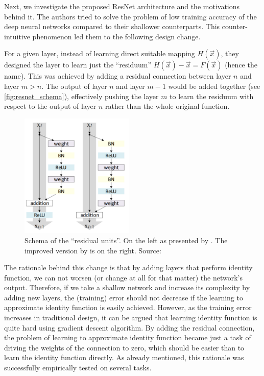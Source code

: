 Next, we investigate the proposed ResNet architecture and the motivations behind it. The authors tried to solve the problem of low training accuracy of the deep neural networks compared to their shallower counterparts. This counter-intuitive phenomenon led them to the following design change.

For a given layer, instead of learning direct suitable mapping $H(\vec{x})$, they designed the layer to learn just the ``residuum'' $H(\vec{x}) - \vec{x} = F(\vec{x})$ (hence the name). This was achieved by adding a residual connection between layer $n$ and layer $m > n$. The output of layer $n$ and layer $m - 1$ would be added together (see \autoref{fig:resnet_schema}), effectively pushing the layer $m$ to learn the residuum with respect to the output of layer $n$ rather than the whole original function.

\begin{figure}
    \centering
    \includegraphics[width=0.48\textwidth]{img/resnetv2.png}
    \caption[Residual units]{Schema of the ``residual units''. On the left as presented by \cite{resnet}. The improved version by \cite{resnetimp} is on the right. Source: \cite{resnetimp}}
    \label{fig:resnet_schema}
\end{figure}

The rationale behind this change is that by adding layers that perform identity function, we can not worsen (or change at all for that matter) the network's output. Therefore, if we take a shallow network and increase its complexity by adding new layers, the (training) error should not decrease if the learning to approximate identity function is easily achieved. However, as the training error increases in traditional design, it can be argued that learning identity function is quite hard using gradient descent algorithm. By adding the residual connection, the problem of learning to approximate identity function became just a task of driving the weights of the connection to zero, which should be easier than to learn the identity function directly. As already mentioned, this rationale was successfully empirically tested on several tasks.

